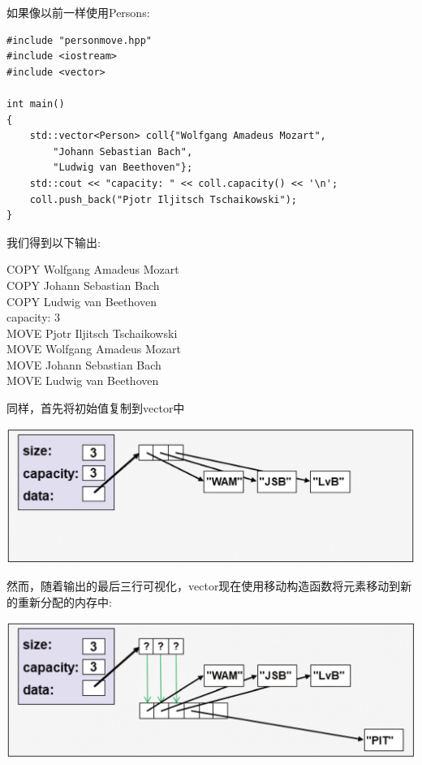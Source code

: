 如果像以前一样使用Persons:\par

{\color{red}{basics/personmove.cpp}}\par

\begin{lstlisting}[caption={}]
#include "personmove.hpp"
#include <iostream>
#include <vector>

int main()
{
	std::vector<Person> coll{"Wolfgang Amadeus Mozart",
		"Johann Sebastian Bach",
		"Ludwig van Beethoven"};
	std::cout << "capacity: " << coll.capacity() << '\n';
	coll.push_back("Pjotr Iljitsch Tschaikowski");
}
\end{lstlisting}

我们得到以下输出:\par

\begin{tcolorbox}[colback=white,colframe=black]
COPY Wolfgang Amadeus Mozart \\ 
COPY Johann Sebastian Bach \\
COPY Ludwig van Beethoven \\
capacity: 3 \\
MOVE Pjotr Iljitsch Tschaikowski \\
MOVE Wolfgang Amadeus Mozart \\
MOVE Johann Sebastian Bach \\
MOVE Ludwig van Beethoven
\end{tcolorbox}

同样，首先将初始值复制到vector中\par

\begin{center}
	\includegraphics[width=1.0\textwidth]{content/1/chapter7/images/4}
\end{center}

然而，随着输出的最后三行可视化，vector现在使用移动构造函数将元素移动到新的重新分配的内存中:\par

\begin{center}
	\includegraphics[width=1.0\textwidth]{content/1/chapter7/images/5}
\end{center}

